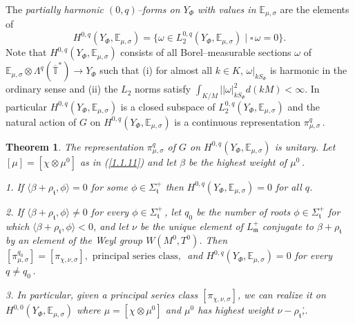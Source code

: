 \documentclass{conm-p-l}
\newtheorem{theorem}[equation]{Theorem}
\def\gm{\mathfrak{m}}
\def\gt{\mathfrak{t}}
\def\E{\mathbb{E}}
\def\T{\mathbb{T}}
\begin{document}
The {\em partially harmonic $(0,q)$--forms on $Y_\Phi$ with values in 
$\E_{\mu,\sigma}$} are the elements of
\begin{equation}\label{1.2.18}
H^{0,q}(Y_\Phi,\E_{\mu,\sigma}) = \{\omega \in L_2^{0,q}(Y_\Phi,\E_{\mu,\sigma})
	\mid \square\,\omega = 0\}.
\end{equation}
Note that $H^{0,q}(Y_\Phi,\E_{\mu,\sigma})$ consists of all Borel--measurable
sections $\omega$ of 
$\E_{\mu,\sigma}\otimes \Lambda^q(\overline{\T}^*) \to Y_\Phi$ such that
(i) for almost all $k \in K$, $\omega|_{kS_\Phi}$ is harmonic in the ordinary
sense and (ii) the $L_2$ norms satisfy 
$\int_{K/M} ||\omega|_{kS_\Phi}^2 d(kM) < \infty$.  In particular
$H^{0,q}(Y_\Phi,\E_{\mu,\sigma})$ is a closed subspace of 
$L_2^{0,q}(Y_\Phi,\E_{\mu,\sigma})$ and the natural action of $G$ on
$H^{0,q}(Y_\Phi,\E_{\mu,\sigma})$ is a continuous representation
$\pi_{\mu,\sigma}^q$\,.

\begin{theorem}\label{1.2.19}
The representation $\pi_{\mu,\sigma}^q$ of $G$ on
$H^{0,q}(Y_\Phi,\E_{\mu,\sigma})$ is unitary.  Let 
$[\mu] = [\chi\otimes \mu^0]$ 
as in {\rm (\ref{1.1.11})} and let $\beta$ be the highest weight of $\mu^0$\,.

{\rm 1.}\phantom{X} If $\langle \beta + \rho_\gt, \phi \rangle = 0$ for some
$\phi \in \Sigma_\gt^+$ then $H^{0,q}(Y_\Phi,\E_{\mu,\sigma}) = 0$ for all $q$.

{\rm 2.}\phantom{X} If $\langle \beta + \rho_\gt, \phi \rangle \ne 0$ for
every $\phi \in \Sigma_\gt^+$\,, let $q_0$ be the number of roots
$\phi \in \Sigma_\gt^+$ for which $\langle \beta + \rho_\gt, \phi \rangle < 0$,
and let $\nu$ be the unique element of $L_\gm^+$ conjugate to 
$\beta + \rho_\gt$ by an element of the Weyl group $W(M^0,T^0)$.  Then
$
[\pi_{\mu,\sigma}^{q_0}] = [\pi_{\chi,\nu,\sigma}], \text{ principal
	series class, }
$
and $H^{0,q}(Y_\Phi,\E_{\mu,\sigma}) = 0$ for every $q \ne q_0$\,.

{\rm 3.}\phantom{X} In particular, given a principal series class
$[\pi_{\chi,\nu,\sigma}]$, we can realize it on 
$H^{0,0}(Y_\Phi,\E_{\mu,\sigma})$ where $\mu = [\chi \otimes \mu^0]$ and
$\mu^0$ has highest weight $\nu - \rho_\gt$\.,.
\end{theorem}
\end{document}
